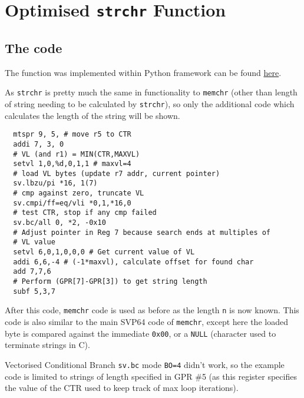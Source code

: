 %

\section{Optimised \texttt{strchr} Function}

\subsection{The code}

The function was implemented within Python framework can be found
\href{https://github.com/ngisearchsvp64/glibc-svp64/blob/master/svp64-port/experimentation/test_strchr.py}{here}.

As \texttt{strchr} is pretty much the same in functionality to \texttt{memchr}
(other than length of string needing to be calculated by \texttt{strchr}), so
only the additional code which calculates the length of the string will be shown.

\begin{verbatim}
  mtspr 9, 5, # move r5 to CTR
  addi 7, 3, 0
  # VL (and r1) = MIN(CTR,MAXVL)
  setvl 1,0,%d,0,1,1 # maxvl=4
  # load VL bytes (update r7 addr, current pointer)
  sv.lbzu/pi *16, 1(7)
  # cmp against zero, truncate VL
  sv.cmpi/ff=eq/vli *0,1,*16,0
  # test CTR, stop if any cmp failed
  sv.bc/all 0, *2, -0x10
  # Adjust pointer in Reg 7 because search ends at multiples of
  # VL value
  setvl 6,0,1,0,0,0 # Get current value of VL
  addi 6,6,-4 # (-1*maxvl), calculate offset for found char
  add 7,7,6
  # Perform (GPR[7]-GPR[3]) to get string length
  subf 5,3,7
\end{verbatim}

After this code, \texttt{memchr} code is used as before as the length
\texttt{n} is now known.
This code is also similar to the main \acrshort{SVP64} code of \texttt{memchr},
except here the loaded byte is compared against the immediate \texttt{0x00},
or a \texttt{NULL} (character used to terminate strings in C).

Vectorised Conditional Branch \texttt{sv.bc} mode \texttt{BO=4} didn't work,
so the example code is limited to strings of length specified in \acrshort{GPR} \#5
(as this register specifies the value of the \acrfull{CTR} used to keep track
of max loop iterations).
